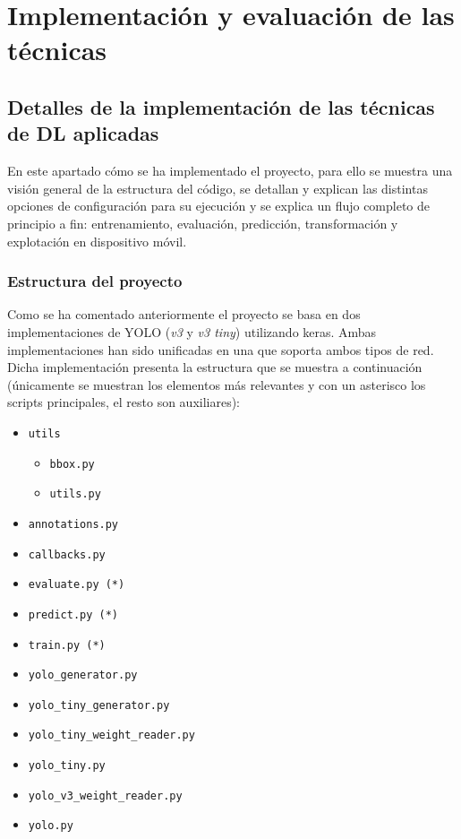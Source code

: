 \section{Implementación y evaluación de las técnicas}
\label{sec:implementacion_y_evaluacion_de_las_tecnicas}

\subsection{Detalles de la implementación de las técnicas de DL aplicadas}

En este apartado cómo se ha implementado el proyecto, para ello se muestra una visión general de la estructura del código, se detallan y explican las distintas opciones de configuración para su ejecución y se explica un flujo completo de principio a fin: entrenamiento, evaluación, predicción, transformación y explotación en dispositivo móvil.

\subsubsection*{Estructura del proyecto}

Como se ha comentado anteriormente el proyecto se basa en dos implementaciones de YOLO (\textit{v3} y \textit{v3 tiny}) utilizando keras. Ambas implementaciones han sido unificadas en una que soporta ambos tipos de red. Dicha implementación presenta la estructura que se muestra a continuación (únicamente se muestran los elementos más relevantes y con un asterisco los scripts principales, el resto son auxiliares):

\begin{itemize}
	\item \texttt{utils}
	\begin{itemize}
		\item \texttt{bbox.py}
		\item \texttt{utils.py}
	\end{itemize}
	\item \texttt{annotations.py}
	\item \texttt{callbacks.py}
	\item \texttt{evaluate.py (*)}
	\item \texttt{predict.py (*)}
	\item \texttt{train.py (*)}
	\item \texttt{yolo\_generator.py}
	\item \texttt{yolo\_tiny\_generator.py}
	\item \texttt{yolo\_tiny\_weight\_reader.py}
	\item \texttt{yolo\_tiny.py}
	\item \texttt{yolo\_v3\_weight\_reader.py}
	\item \texttt{yolo.py}
\end{itemize}

